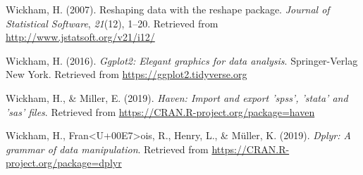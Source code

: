 \documentclass[man]{apa6}
\begin{document}
\hypertarget{ref-R-reshape2}{}
Wickham, H. (2007). Reshaping data with the reshape package.
\emph{Journal of Statistical Software}, \emph{21}(12), 1--20. Retrieved
from \url{http://www.jstatsoft.org/v21/i12/}

\hypertarget{ref-R-ggplot2}{}
Wickham, H. (2016). \emph{Ggplot2: Elegant graphics for data analysis}.
Springer-Verlag New York. Retrieved from
\url{https://ggplot2.tidyverse.org}

\hypertarget{ref-R-haven}{}
Wickham, H., \& Miller, E. (2019). \emph{Haven: Import and export
'spss', 'stata' and 'sas' files}. Retrieved from
\url{https://CRAN.R-project.org/package=haven}

\hypertarget{ref-R-dplyr}{}
Wickham, H., Fran\textless{}U+00E7\textgreater{}ois, R., Henry, L., \&
Müller, K. (2019). \emph{Dplyr: A grammar of data manipulation}.
Retrieved from \url{https://CRAN.R-project.org/package=dplyr}

\endgroup
\end{document}
